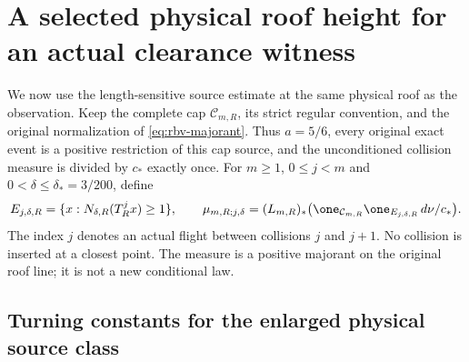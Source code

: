 \section{A selected physical roof height for an actual clearance witness}
\label{sec:lc-roof}

We now use the length-sensitive source estimate at the same physical
roof as the observation.  Keep the complete cap
$\mathcal C_{m,R}$, its strict regular convention, and the original
normalization of \eqref{eq:rbv-majorant}.  Thus $a=5/6$, every original
exact event is a positive restriction of this cap source, and the
unconditioned collision measure is divided by $c_*$ exactly once.
For $m\ge1$, $0\le j<m$ and $0<\delta\le\delta_*=3/200$, define
\begin{equation}\label{eq:lc-selected-roof}
 E_{j,\delta,R}=\{x:N_{\delta,R}(T_R^jx)\ge1\},\qquad
 \mu_{m,R;j,\delta}
   =(L_{m,R})_*\bigl(\one_{\mathcal C_{m,R}}
                        \one_{E_{j,\delta,R}}\,d\nu/c_*\bigr).
\end{equation}
The index $j$ denotes an actual flight between collisions $j$ and $j+1$.
No collision is inserted at a closest point.  The measure is a positive
majorant on the original roof line; it is not a new conditional law.

\subsection{Turning constants for the enlarged physical source class}

